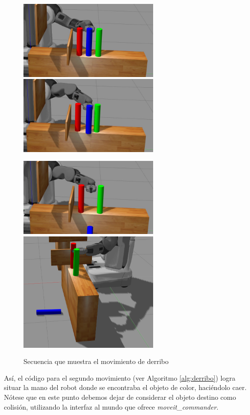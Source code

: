 \documentclass[12pt,spanish,chapterprefix, numbers=noenddot]{book}
\numberwithin{equation}{section}
\numberwithin{figure}{section}
\begin{document}
\begin{figure}[hbt!]
\centering
\includegraphics[width=7cm]{Figs/fase5_1.png}
\includegraphics[width=7cm]{Figs/fase5_2.png}
\par
\centering
\includegraphics[width=7cm]{Figs/fase5_3.png}
\includegraphics[width=7cm]{Figs/pose2_2.png}
\par
\caption{\label{fig:derribo}Secuencia que muestra el movimiento de derribo}
\end{figure}

Así, el código para el segundo movimiento (ver Algoritmo \ref{alg:derribo}) logra situar la mano del robot donde se encontraba el objeto de color, haciéndolo caer. Nótese que en este punto debemos dejar de considerar el objeto destino como colisión, utilizando la interfaz al mundo que ofrece \textit{moveit\_commander}. 
\end{document}
